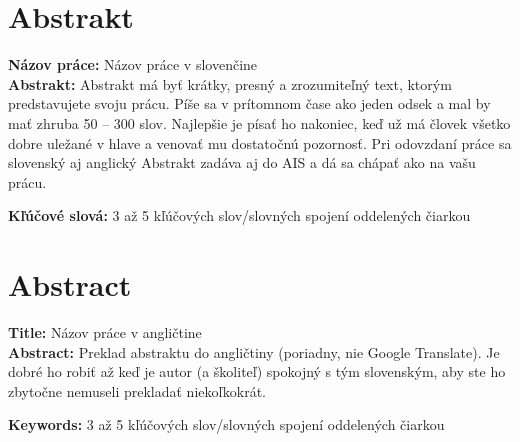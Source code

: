 
\section*{Abstrakt}

\noindent \textbf{Názov práce:} Názov práce v slovenčine\\
\textbf{Abstrakt:} Abstrakt má byť krátky, presný a zrozumiteľný text, ktorým predstavujete svoju prácu. Píše sa v prítomnom čase ako jeden odsek a mal by mať zhruba 50 -- 300 slov. Najlepšie je písať ho nakoniec, keď už má človek všetko dobre uležané v hlave a venovať mu dostatočnú pozornosť. Pri odovzdaní práce sa slovenský aj anglický Abstrakt zadáva aj do AIS a dá sa chápať ako  na vašu prácu.

\vspace{10pt}

\noindent \textbf{Kľúčové slová:} 3 až 5 kľúčových slov/slovných spojení oddelených čiarkou

\vspace{+20pt}


\section*{Abstract}
\noindent \textbf{Title:} Názov práce v angličtine\\
\textbf{Abstract:} Preklad abstraktu do angličtiny (poriadny, nie Google Translate). Je dobré ho robiť až keď je autor (a školiteľ) spokojný s tým slovenským, aby ste ho zbytočne nemuseli prekladať niekoľkokrát.

\vspace{10pt}

\noindent \textbf{Keywords:} 3 až 5 kľúčových slov/slovných spojení oddelených čiarkou
